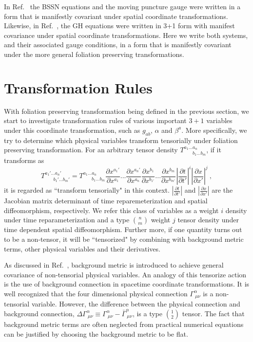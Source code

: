 In Ref.~\cite{Brown:2009dd} the BSSN equations and the moving puncture gauge were written in a form that is manifestly covariant under spatial coordinate transformations. 
Likewise, in Ref.~\cite{Brown:2011qg}, the GH equations were written in 3+1 form with manifest covariance 
under spatial coordinate transformations.  Here we write both systems, and their associated gauge conditions, in a form 
that is manifestly covariant under the more general foliation preserving transformations. 

\section{Transformation Rules}\label{transform}
With foliation preserving transformation being defined in the previous section, we start to investigate transformation rules of various important $3 + 1$ variables under this coordinate transformation, such as $g_{ab}$, $\alpha$ and $\beta^{a}$. More specifically, we try to determine which physical variables transform tensorially under foliation preserving transformation. For an arbitrary tensor density $T^{a_{1}...a_{n}}_{~~~~~~~~b_{1}...b_{m}}$, if it transforms as
\begin{equation}
	T^{a_{1}'...a_{n}'}_{~~~~~~~~b_{1}'...b_{m}'} = T^{a_{1}...a_{n}}_{~~~~~~~~b_{1}...b_{m}}\frac{\partial x^{a_{1}'}}{\partial x^{a_{1}}}...\frac{\partial x^{a_{n}'}}{\partial x^{a_{n}}}\frac{\partial x^{b_{1}}}{\partial x^{b_{1'}}}...\frac{\partial x^{b_{m}}}{\partial x^{b_{m'}}}\left|\frac{\partial t}{\partial t'}\right|^{i}\left|\frac{\partial x}{\partial x'}\right|^{j} \ ,
\end{equation}
it is regarded as ``transform tensorially" in this context. $\left|\frac{\partial t}{\partial t'}\right|$ and $\left|\frac{\partial x}{\partial x'}\right|$ are the Jacobian matrix determinant of time reparemeterization and spatial diffeomorphism, respectively. We refer this class of variables as a weight $i$ density under time reparameterization and a type $n \choose m$ weight $j$ tensor density under time dependent spatial diffeomorphism. Further more, if one quantity turns out to be a non-tensor, it will be ``tensorized" by combining with background metric terms, other physical variables and their derivatives. 

As discussed in Ref.~\cite{Brown:2010rya, Brown:2011qg}, background metric is introduced to achieve general covariance of non-tensorial physical variables. An analogy of this tensorize action is the use of background connection in spacetime coordinate transformations. It is well recognized that the four dimensional physical connection $\Gamma^{\alpha}_{~\mu\nu}$ is a non-tensorial variable. However, the difference between the physical connection and background connection, $\Delta \Gamma^{\alpha}_{~\mu\nu} \equiv \Gamma^{\alpha}_{~\mu\nu} - {\bar \Gamma}^{\alpha}_{~\mu\nu}$, is a type $1 \choose 2$ tensor. The fact that background metric terms are often neglected from practical numerical equations can be justified by choosing the background metric to be flat. 

